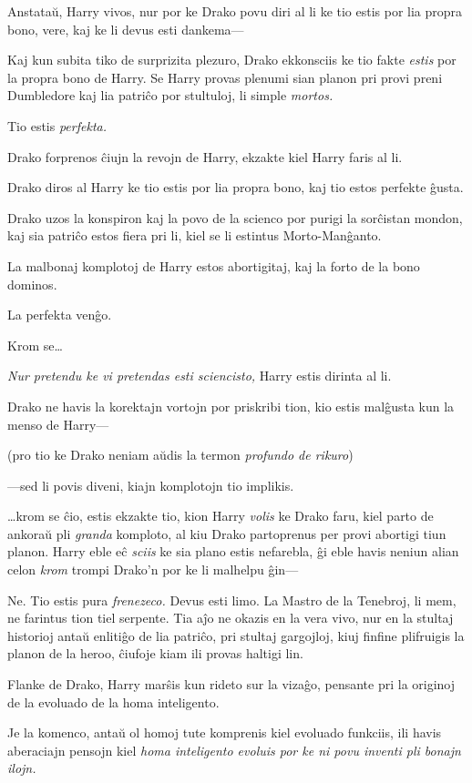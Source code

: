 Anstataŭ, Harry vivos, nur por ke Drako povu diri al li ke tio estis
por lia propra bono, vere, kaj ke li devus esti dankema—

Kaj kun subita tiko de surprizita plezuro, Drako ekkonsciis ke tio
fakte \emph{estis} por la propra bono de Harry. Se Harry provas
plenumi sian planon pri provi preni Dumbledore kaj lia patriĉo por 
stultuloj, li simple \emph{mortos.}

Tio estis \emph{perfekta.}

Drako forprenos ĉiujn la revojn de Harry, ekzakte kiel Harry faris al li.

Drako diros al Harry ke tio estis por lia propra bono, kaj tio estos perfekte ĝusta.

Drako uzos la konspiron kaj la povo de la scienco por purigi la
sorĉistan mondon, kaj sia patriĉo estos fiera pri li, kiel se li
estintus Morto-Manĝanto.

La malbonaj komplotoj de Harry estos abortigitaj, kaj la forto de la
bono dominos.

La perfekta venĝo.

Krom se\ldots{}

\emph{Nur pretendu ke vi pretendas esti sciencisto,} Harry estis dirinta al li.

Drako ne havis la korektajn vortojn por priskribi tion, kio estis malĝusta kun la menso de Harry— 

(pro tio ke Drako neniam aŭdis la termon \emph{profundo de rikuro})

—sed li povis diveni, kiajn komplotojn tio implikis.

\ldots{}krom se ĉio, estis ekzakte tio, kion Harry \emph{volis} ke
Drako faru, kiel parto de ankoraŭ pli \emph{granda} komploto, al kiu
Drako partoprenus per provi abortigi tiun planon. Harry eble eĉ
\emph{sciis} ke sia plano estis nefarebla, ĝi eble havis neniun alian
celon \emph{krom} trompi Drako'n por ke li malhelpu ĝin—

Ne. Tio estis pura \emph{frenezeco.} Devus esti limo. La Mastro de la
Tenebroj, li mem, ne farintus tion tiel serpente. Tia aĵo ne okazis en
la vera vivo, nur en la stultaj historioj antaŭ enlitiĝo de lia
patriĉo, pri stultaj gargojloj, kiuj finfine plifruigis la planon de
la heroo, ĉiufoje kiam ili provas haltigi lin.

\later

Flanke de Drako, Harry marŝis kun rideto sur la vizaĝo, pensante pri
la originoj de la evoluado de la homa inteligento.

Je la komenco, antaŭ ol homoj tute komprenis kiel evoluado funkciis,
ili havis aberaciajn pensojn kiel \emph{homa inteligento evoluis por
  ke ni povu inventi pli bonajn ilojn.}

